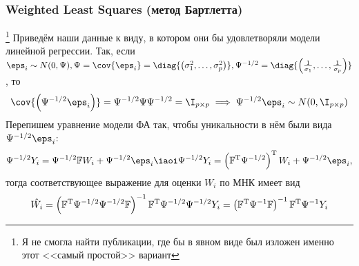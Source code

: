       \subsubsection{Weighted Least Squares (метод Бартлетта)}\footnote{Я не смогла найти публикации, где бы в явном виде был изложен именно этот <<самый простой>> вариант}
        Приведём наши данные к виду, в котором они бы удовлетворяли модели линейной регрессии. Так, если $\boldsymbol\eps_i\sim N(0, \Psi), \Psi = \cov{\boldsymbol\eps_i} = \diag{\left(\sigma_1^2, \ldots, \sigma_p^2\right)}, \Psi^{-1/2} = \diag{\left(\frac{1}{\sigma_1}, \ldots, \frac{1}{\sigma_p}\right)}$, то 
        $$\cov{\left(\Psi^{-1/2}\boldsymbol\eps_i\right)} = \Psi^{-1/2}\Psi\Psi^{-1/2} = \I_{p\times p} \implies \Psi^{-1/2}\boldsymbol\eps_i \sim N(0, \I_{p\times p})$$
        Перепишем уравнение модели ФА так, чтобы уникальности в нём были вида $\Psi^{-1/2}\boldsymbol\eps_i$:
        \begin{equation}
        \Psi^{-1/2} Y_i = \Psi^{-1/2} \mathbb F W_i + \Psi^{-1/2}\boldsymbol\eps_i \iaoi \Psi^{-1/2} Y_i = \left(\mathbb F^\tr \Psi^{-1/2}\right)^\tr W_i + \Psi^{-1/2}\boldsymbol\eps_i,
        \end{equation}
        тогда соответствующее выражение для оценки $W_i$ по МНК имеет вид
        $$\hat{W_i} = \left(\mathbb F^\mathrm T \Psi^{-1/2} \Psi^{-1/2} \mathbb F\right)^{-1}\mathbb F^\mathrm T \Psi^{-1/2}\Psi^{-1/2} Y_i = \left(\mathbb F^\mathrm T \Psi^{-1} \mathbb F\right)^{-1} \mathbb F^\mathrm T \Psi^{-1} Y_i$$
